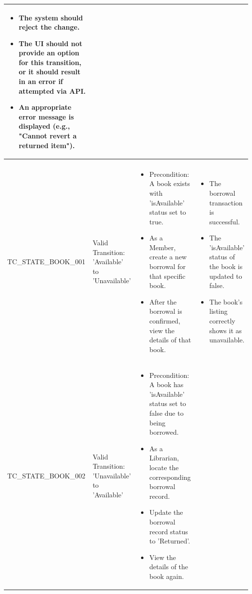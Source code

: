 \documentclass[10pt, a4paper]{report}
\begin{document}
\begin{longtable}{|>{\raggedright\arraybackslash}p{4cm}|>{\raggedright\arraybackslash}p{4cm}|>{\raggedright\arraybackslash}p{4.5cm}|>{\raggedright\arraybackslash}p{4cm}|}
\begin{itemize}[noitemsep, topsep=0pt, partopsep=0pt, leftmargin=*]
        \item The system should reject the change.
        \item The UI should not provide an option for this transition, or it should result in an error if attempted via API.
        \item An appropriate error message is displayed (e.g., "Cannot revert a returned item").
    \end{itemize} \\ \hline

\multicolumn{4}{|l|}{\textbf{Entity: Book (Based on 'isAvailable' attribute )}} \\ \hline
TC\_STATE\_BOOK\_001 & Valid Transition: 'Available' to 'Unavailable' & 
    \begin{itemize}[noitemsep, topsep=0pt, partopsep=0pt, leftmargin=*]
        \item Precondition: A book exists with 'isAvailable' status set to true.
        \item As a Member, create a new borrowal for that specific book. 
        \item After the borrowal is confirmed, view the details of that book. 
    \end{itemize} & 
    \begin{itemize}[noitemsep, topsep=0pt, partopsep=0pt, leftmargin=*]
        \item The borrowal transaction is successful. 
        \item The 'isAvailable' status of the book is updated to false. 
        \item The book's listing correctly shows it as unavailable.
    \end{itemize} \\ \hline
TC\_STATE\_BOOK\_002 & Valid Transition: 'Unavailable' to 'Available' & 
    \begin{itemize}[noitemsep, topsep=0pt, partopsep=0pt, leftmargin=*]
        \item Precondition: A book has 'isAvailable' status set to false due to being borrowed.
        \item As a Librarian, locate the corresponding borrowal record.
        \item Update the borrowal record status to 'Returned'. 
        \item View the details of the book again.
    \end{itemize} & 
    \begin{itemize}[noitemsep, topsep=0pt, partopsep=0pt, leftmargin=*]

\end{itemize}
\end{longtable}
\end{document}
